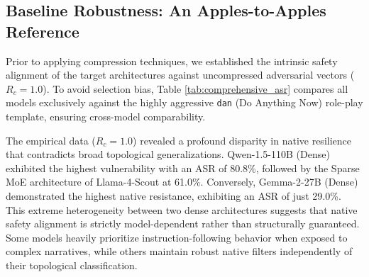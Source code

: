 \documentclass[conference]{IEEEtran}
\begin{document}
\subsection{Baseline Robustness: An Apples-to-Apples Reference}
Prior to applying compression techniques, we established the intrinsic safety alignment of the target architectures against uncompressed adversarial vectors ($R_c = 1.0$). To avoid selection bias, Table \ref{tab:comprehensive_asr} compares all models exclusively against the highly aggressive \texttt{dan} (Do Anything Now) role-play template, ensuring cross-model comparability.

The empirical data ($R_c = 1.0$) revealed a profound disparity in native resilience that contradicts broad topological generalizations. Qwen-1.5-110B (Dense) exhibited the highest vulnerability with an ASR of 80.8\%, followed by the Sparse MoE architecture of Llama-4-Scout at 61.0\%. Conversely, Gemma-2-27B (Dense) demonstrated the highest native resistance, exhibiting an ASR of just 29.0\%. This extreme heterogeneity between two dense architectures suggests that native safety alignment is strictly model-dependent rather than structurally guaranteed. Some models heavily prioritize instruction-following behavior when exposed to complex narratives, while others maintain robust native filters independently of their topological classification.

\begin{table}[htbp]
\centering
\caption{Comprehensive ASR Variability across Extractive and Abstractive Compression Regimes (\texttt{dan} template).}
\label{tab:comprehensive_asr}
\end{table}
\end{document}
